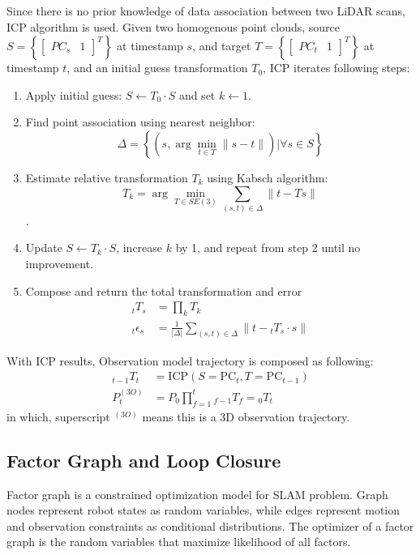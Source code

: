 \documentclass[conference]{IEEEtran}
\begin{document}
Since there is no prior knowledge of data association between two LiDAR scans,
ICP algorithm is used.
Given two homogenous point clouds, 
source $S = \left\{\left[ \begin{matrix}PC_{s}& 1\end{matrix} \right]^T \right\} $ at timestamp $s$,
and target $T = \left\{\left[ \begin{matrix}PC_{t}& 1\end{matrix} \right]^T \right\}$ at timestamp $t$,
and an initial guess transformation $T_0$,
ICP iterates following steps:
\begin{enumerate}
    \item Apply initial guess: $S \leftarrow T_0 \cdot S$ and set $k \leftarrow 1$.
    
    \item Find point association using nearest neighbor:
    $$ \Delta = \left\{\left(s, \arg\min_{t\in T} \|s - t\| \right) \bigg| \forall s\in S\right\}$$

    \item Estimate relative transformation $T_k$ using Kabsch algorithm:
    $$T_k = \arg\min_{T\in SE(3)} \sum\limits_{(s,t)\in\Delta} \|t - Ts\|$$.
    
    \item Update $S \leftarrow T_k \cdot S$, increase $k$ by 1, and repeat from step 2 until no improvement.

    \item Compose and return the total transformation and error 
    $$ \begin{aligned}
        {}_tT_s & = \prod_k T_k \\
        {}_t\epsilon_s &= \frac{1}{|\Delta|} \sum_{(s,t)\in\Delta} \|t - {}_tT_s\cdot s\| 
    \end{aligned}$$
\end{enumerate}


With ICP results, Observation model trajectory is composed as following:
$$
\begin{aligned}
    _{t-1}T_{t}
        &=\text{ICP}(S=\mathrm{PC}_{t}, T=\mathrm{PC}_{t-1}) \\ 
    P^{(3O)}_{t}
        &=P_{0}\prod^{t}_{f=1} {}_{f-1}T_{f} = {}_{0}T_{t}
\end{aligned} 
$$
in which, superscript $^{(3O)}$ means this is a 3D observation trajectory.

\subsection{Factor Graph and Loop Closure}
Factor graph is a constrained optimization model for SLAM problem.
Graph nodes represent robot states as random variables,
while edges represent motion and observation constraints as conditional distributions.
The optimizer of a factor graph is the random variables that maximize likelihood of all factors.
\end{document}
